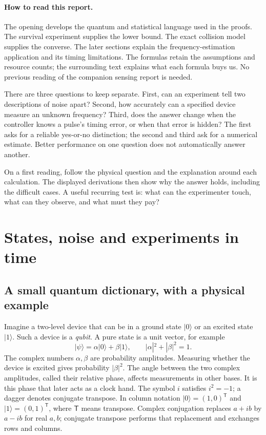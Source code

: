\documentclass[11pt,a4paper]{article}
\numberwithin{equation}{section}
\theoremstyle{remark}
\begin{document}
\paragraph{How to read this report.}
The opening develops the quantum and statistical language used in the proofs.
The survival experiment supplies the lower bound. The exact collision model
supplies the converse. The later sections explain the frequency-estimation
application and its timing limitations. The formulas retain the assumptions
and resource counts; the surrounding text explains what each formula buys us.
No previous reading of the companion sensing report is needed.

There are three questions to keep separate. First, can an experiment tell
two descriptions of noise apart? Second, how accurately can a specified
device measure an unknown frequency? Third, does the answer change when
the controller knows a pulse's timing error, or when that error is hidden?
The first asks for a reliable yes-or-no distinction; the second and third
ask for a numerical estimate. Better performance on one question does not
automatically answer another.

On a first reading, follow the physical question and the explanation around
each calculation. The displayed derivations then show why the answer holds,
including the difficult cases. A useful recurring test is:
what can the experimenter touch, what can they observe, and what must they pay?

\clearpage
\tableofcontents
\clearpage

\section{States, noise and experiments in time}
\label{sec:foundations}

\subsection{A small quantum dictionary, with a physical example}

Imagine a two-level device that can be in a ground state $|0\rangle$ or an
excited state $|1\rangle$. Such a device is a \emph{qubit}. A pure state is a
unit vector, for example
\begin{equation}
 |\psi\rangle=\alpha|0\rangle+\beta|1\rangle,
 \qquad |\alpha|^2+|\beta|^2=1.
\end{equation}
The complex numbers $\alpha,\beta$ are probability amplitudes. Measuring
whether the device is excited gives probability $|\beta|^2$. The angle
between the two complex amplitudes, called their relative phase, affects
measurements in other bases. It is this phase that later acts as a clock hand.
The symbol $i$ satisfies $i^2=-1$; a dagger denotes conjugate transpose.
In column notation $|0\rangle=(1,0)^{\mathsf T}$ and
$|1\rangle=(0,1)^{\mathsf T}$, where $\mathsf T$ means transpose.
Complex conjugation replaces $a+ib$ by $a-ib$ for real $a,b$;
conjugate transpose performs that replacement and exchanges rows and columns.
\end{document}
